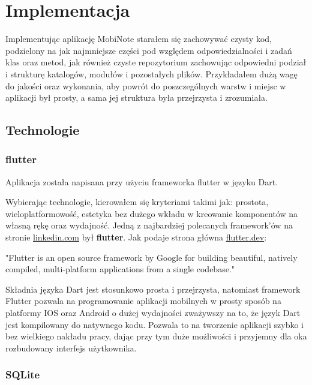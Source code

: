 \chapter{Implementacja}

Implementując aplikację MobiNote starałem się zachowywać czysty kod, podzielony na jak najmniejsze części pod względem odpowiedzialności i zadań klas oraz metod, jak również czyste repozytorium zachowując odpowiedni podział i strukturę katalogów, modułów i pozostałych plików. Przykładałem dużą wagę do jakości oraz wykonania, aby powrót do poszczególnych warstw i miejsc w aplikacji był prosty, a sama jej struktura była przejrzysta i zrozumiała. 

\section{Technologie}

\subsection{flutter}

Aplikacja została napisana przy użyciu frameworka flutter w języku Dart.

Wybierając technologie, kierowałem się kryteriami takimi jak: prostota, wieloplatformowość, estetyka bez dużego wkładu w kreowanie komponentów na własną rękę oraz wydajność. Jedną z najbardziej polecanych framework'ów na stronie \href{https://www.linkedin.com/pulse/best-9-mobile-app-development-frameworks-2023-sstech-system/}{linkedin.com} był \textbf{flutter}. Jak podaje strona główna \href{https://www.flutter.dev}{flutter.dev}:

"Flutter is an open source framework by Google for building beautiful, natively compiled, multi-platform applications from a single codebase."

Składnia języka Dart jest stosunkowo prosta i przejrzysta, natomiast framework Flutter pozwala na programowanie aplikacji mobilnych w prosty sposób na platformy IOS oraz Android o dużej wydajności zważywszy na to, że język Dart jest kompilowany do natywnego kodu. Pozwala to na tworzenie aplikacji szybko i bez wielkiego nakładu pracy, dając przy tym duże możliwości i przyjemny dla oka rozbudowany interfejs użytkownika.


\subsection{SQLite}

